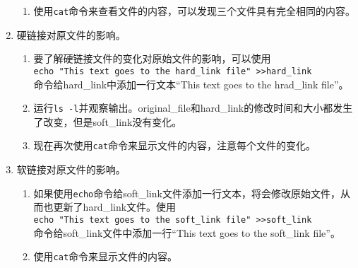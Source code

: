 \begin{enumerate}
\begin{enumerate}
      \item 使用\verb|cat|命令来查看文件的内容，可以发现三个文件具有完全相同的内容。
    \end{enumerate}
  \item 硬链接对原文件的影响。
    \begin{enumerate}
      \item 要了解硬链接文件的变化对原始文件的影响，可以使用\\ \verb|echo "This text goes to the hard_link file" >>hard_link| \\ 命令给hard\_link中添加一行文本“This text goes to the hrad\_link file”。
      \item 运行\verb|ls -l|并观察输出。original\_file和hard\_link的修改时间和大小都发生了改变，但是soft\_link没有变化。
      \item 现在再次使用\verb|cat|命令来显示文件的内容，注意每个文件的变化。
    \end{enumerate}
  \item 软链接对原文件的影响。
    \begin{enumerate}
      \item 如果使用\verb|echo|命令给soft\_link文件添加一行文本，将会修改原始文件，从而也更新了hard\_link文件。使用\\ \verb|echo "This text goes to the soft_link file" >>soft_link| \\ 命令给soft\_link文件中添加一行“This text goes to the soft\_link file”。
      \item 使用\verb|cat|命令来显示文件的内容。
    \end{enumerate}
\end{enumerate}

